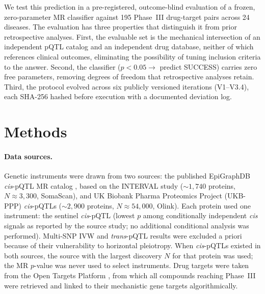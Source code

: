 \documentclass[11pt]{article}
\begin{document}
We test this prediction in a pre-registered, outcome-blind evaluation of a frozen, zero-parameter MR classifier against 195 Phase~III drug-target pairs across 24 diseases. The evaluation has three properties that distinguish it from prior retrospective analyses. First, the evaluable set is the mechanical intersection of an independent pQTL catalog and an independent drug database, neither of which references clinical outcomes, eliminating the possibility of tuning inclusion criteria to the answer. Second, the classifier ($p < 0.05 \rightarrow$ predict SUCCESS) carries zero free parameters, removing degrees of freedom that retrospective analyses retain. Third, the protocol evolved across six publicly versioned iterations (V1--V3.4), each SHA-256 hashed before execution with a documented deviation log.

\section{Methods}
\label{sec:methods}

\paragraph{Data sources.}
Genetic instruments were drawn from two sources: the published EpiGraphDB \emph{cis}-pQTL MR catalog \cite{zheng2020phenome}, based on the INTERVAL study (${\sim}1{,}740$ proteins, $N \approx 3{,}300$, SomaScan), and UK Biobank Pharma Proteomics Project (UKB-PPP) \emph{cis}-pQTLs (${\sim}2{,}900$ proteins, $N \approx 54{,}000$, Olink). Each protein used one instrument: the sentinel \emph{cis}-pQTL (lowest $p$ among conditionally independent \emph{cis} signals as reported by the source study; no additional conditional analysis was performed). Multi-SNP IVW \citep{burgess2013ivw} and \emph{trans}-pQTL results were excluded a priori because of their vulnerability to horizontal pleiotropy. When \emph{cis}-pQTLs existed in both sources, the source with the largest discovery $N$ for that protein was used; the MR $p$-value was never used to select instruments. Drug targets were taken from the Open Targets Platform \cite{ochoa2021opentargets}, from which all compounds reaching Phase~III were retrieved and linked to their mechanistic gene targets algorithmically.
\end{document}
